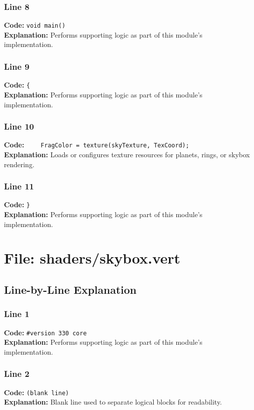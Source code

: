 \documentclass[11pt,a4paper]{article}
\begin{document}
\subsubsection*{Line 8}
\textbf{Code:} \verb|void main()|\\
\textbf{Explanation:} Performs supporting logic as part of this module's implementation.

\subsubsection*{Line 9}
\textbf{Code:} \verb|{|\\
\textbf{Explanation:} Performs supporting logic as part of this module's implementation.

\subsubsection*{Line 10}
\textbf{Code:} \verb|    FragColor = texture(skyTexture, TexCoord);|\\
\textbf{Explanation:} Loads or configures texture resources for planets, rings, or skybox rendering.

\subsubsection*{Line 11}
\textbf{Code:} \verb|}|\\
\textbf{Explanation:} Performs supporting logic as part of this module's implementation.

\newpage
\section{File: shaders/skybox.vert}
\subsection{Line-by-Line Explanation}
\subsubsection*{Line 1}
\textbf{Code:} \verb|#version 330 core|\\
\textbf{Explanation:} Performs supporting logic as part of this module's implementation.

\subsubsection*{Line 2}
\textbf{Code:} \texttt{(blank line)}\\
\textbf{Explanation:} Blank line used to separate logical blocks for readability.
\end{document}
